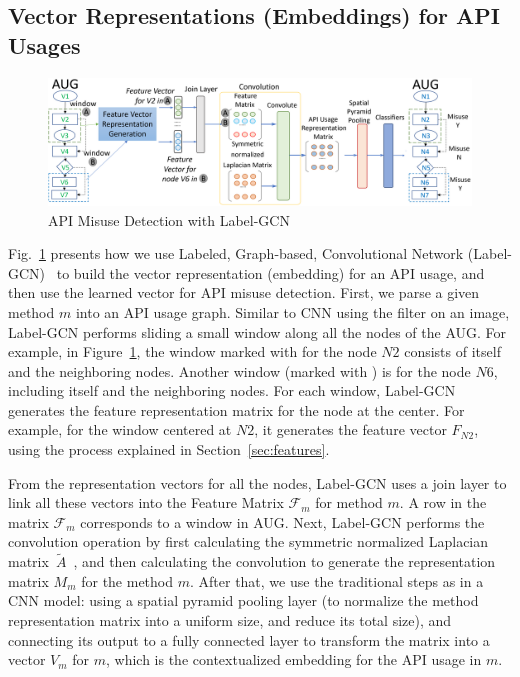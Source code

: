 \subsection{Vector Representations (Embeddings) for API Usages}

\begin{figure}[t]
\begin{center}
\includegraphics[width=5.8in]{gcn-detection.png}
\vspace{-5pt}
\caption{API Misuse Detection with Label-GCN}
\label{fig:gcn-detection}
\end{center}
\end{figure}

Fig.~\ref{fig:gcn-detection} presents how we use Labeled, Graph-based,
Convolutional Network (Label-GCN)~\cite{label-gcn} to build the vector
representation (embedding) for an API usage, and then use the learned
vector for API misuse detection. First, we parse a given method $m$
into an API usage graph. Similar to CNN using the filter on an image,
Label-GCN performs sliding a small window along all the nodes of the
AUG. For example, in Figure~\ref{fig:gcn-detection}, the window marked
with  for the node $N2$ consists of itself and the
neighboring nodes. Another window (marked with ) is for the
node $N6$, including itself and the neighboring nodes. For each
window, Label-GCN generates the feature representation matrix for the
node at the center. For example, for the window centered at $N2$, it
generates the feature vector $F_{N2}$, using the process explained in
Section~\ref{sec:features}.

From the representation vectors for all the nodes, Label-GCN uses a
join layer to link all these vectors into the Feature Matrix
$\mathcal{F}_{m}$ for method $m$. A row in the matrix $\mathcal{F}_m$
corresponds to a window in AUG. Next, Label-GCN performs the
convolution operation by first calculating the symmetric normalized
Laplacian matrix~$\tilde{A}$~\cite{GCN16}, and then calculating the
convolution to generate the representation matrix $M_{m}$ for the
method $m$. After that, we use the traditional steps as in a CNN
model: using a spatial pyramid pooling layer (to normalize the method
representation matrix into a uniform size, and reduce its total size),
and connecting its output to a fully connected layer to transform the
matrix into a vector $V_m$ for $m$, which is the
contextualized embedding for the API usage in $m$.





